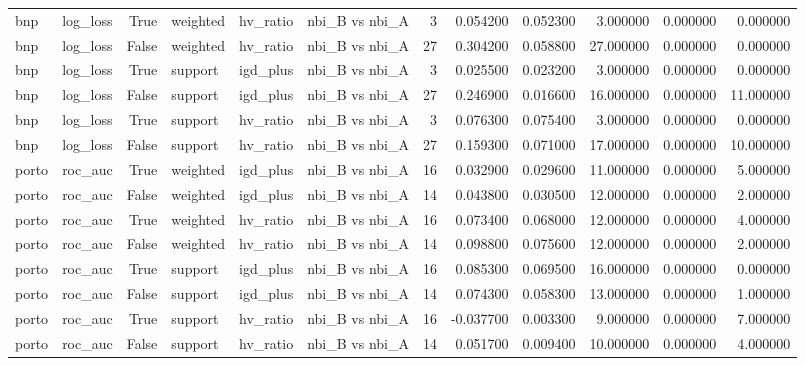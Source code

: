 \begin{longtable}{llrlllrrrrrr}
bnp & log\_loss & True & weighted & hv\_ratio & nbi\_B vs nbi\_A & 3 & 0.054200 & 0.052300 & 3.000000 & 0.000000 & 0.000000 \\
bnp & log\_loss & False & weighted & hv\_ratio & nbi\_B vs nbi\_A & 27 & 0.304200 & 0.058800 & 27.000000 & 0.000000 & 0.000000 \\
bnp & log\_loss & True & support & igd\_plus & nbi\_B vs nbi\_A & 3 & 0.025500 & 0.023200 & 3.000000 & 0.000000 & 0.000000 \\
bnp & log\_loss & False & support & igd\_plus & nbi\_B vs nbi\_A & 27 & 0.246900 & 0.016600 & 16.000000 & 0.000000 & 11.000000 \\
bnp & log\_loss & True & support & hv\_ratio & nbi\_B vs nbi\_A & 3 & 0.076300 & 0.075400 & 3.000000 & 0.000000 & 0.000000 \\
bnp & log\_loss & False & support & hv\_ratio & nbi\_B vs nbi\_A & 27 & 0.159300 & 0.071000 & 17.000000 & 0.000000 & 10.000000 \\
porto & roc\_auc & True & weighted & igd\_plus & nbi\_B vs nbi\_A & 16 & 0.032900 & 0.029600 & 11.000000 & 0.000000 & 5.000000 \\
porto & roc\_auc & False & weighted & igd\_plus & nbi\_B vs nbi\_A & 14 & 0.043800 & 0.030500 & 12.000000 & 0.000000 & 2.000000 \\
porto & roc\_auc & True & weighted & hv\_ratio & nbi\_B vs nbi\_A & 16 & 0.073400 & 0.068000 & 12.000000 & 0.000000 & 4.000000 \\
porto & roc\_auc & False & weighted & hv\_ratio & nbi\_B vs nbi\_A & 14 & 0.098800 & 0.075600 & 12.000000 & 0.000000 & 2.000000 \\
porto & roc\_auc & True & support & igd\_plus & nbi\_B vs nbi\_A & 16 & 0.085300 & 0.069500 & 16.000000 & 0.000000 & 0.000000 \\
porto & roc\_auc & False & support & igd\_plus & nbi\_B vs nbi\_A & 14 & 0.074300 & 0.058300 & 13.000000 & 0.000000 & 1.000000 \\
porto & roc\_auc & True & support & hv\_ratio & nbi\_B vs nbi\_A & 16 & -0.037700 & 0.003300 & 9.000000 & 0.000000 & 7.000000 \\
porto & roc\_auc & False & support & hv\_ratio & nbi\_B vs nbi\_A & 14 & 0.051700 & 0.009400 & 10.000000 & 0.000000 & 4.000000 \\
\end{longtable}\endgroup\addtocounter{table}{-1}
